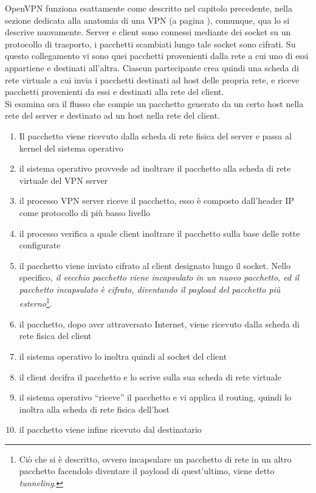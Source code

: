 OpenVPN funziona esattamente come descritto nel capitolo precedente, nella sezione
dedicata alla anatomia di una VPN (a pagina
\pageref{sec:vpn-anatomy}), comunque, qua lo si descrive nuovamente. Server e client
sono connessi mediante dei socket su un protocollo di trasporto, i pacchetti scambiati
lungo tale socket sono cifrati.
Su questo collegamento vi sono quei pacchetti provenienti dalla rete a cui uno di essi
appartiene e destinati all'altra. Ciascun partecipante crea quindi una scheda di rete
virtuale a cui invia i pacchetti destinati ad host delle propria rete, e riceve
pacchetti provenienti da essi e destinati alla rete del client.\\
Si esamina ora il flusso che compie un pacchetto generato da un certo host nella rete
del server e destinato ad un host nella rete del client.
\begin{enumerate}
	\item Il pacchetto viene ricevuto dalla scheda di rete fisica del server e passa
	      al kernel del sistema operativo
	\item il sistema operativo provvede ad inoltrare il pacchetto alla scheda di rete
	      virtuale del VPN server
	\item il processo VPN server riceve il pacchetto, esso è composto dall'header IP come
	      protocollo di più basso livello
	\item il processo verifica a quale client inoltrare il pacchetto sulla base delle rotte
	      configurate
	\item il pacchetto viene inviato cifrato al client designato lungo il socket. Nello
	      specifico, \textit{il vecchio pacchetto viene incapsulato in un nuovo pacchetto,
	      	ed il pacchetto incapsulato è cifrato, diventando il payload del pacchetto
	      	più esterno}\footnote{Ciò che si è descritto, ovvero incapsulare un pacchetto di rete
	      	in un altro pacchetto facendolo diventare il payload di quest'ultimo, viene detto
	      	\textit{tunneling}.}.
	\item il pacchetto, dopo aver attraversato Internet, viene ricevuto dalla scheda di rete
	      fisica del client
	\item il sistema operativo lo inoltra quindi al socket del client
	\item il client decifra il pacchetto e lo scrive sulla sua scheda di rete virtuale
	\item il sistema operativo ``riceve'' il pacchetto e vi applica il routing, quindi
	      lo inoltra alla scheda di rete fisica dell'host
	\item il pacchetto viene infine ricevuto dal destinatario
\end{enumerate}
